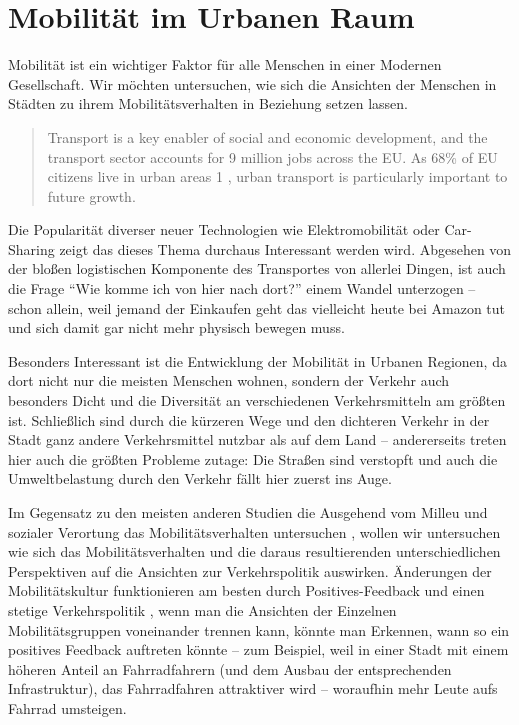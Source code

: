 \section{Mobilität im Urbanen Raum} %
	
	Mobilität ist ein wichtiger Faktor für alle Menschen in einer Modernen Gesellschaft.
	Wir möchten untersuchen, wie sich die Ansichten der Menschen in Städten zu ihrem Mobilitätsverhalten in Beziehung setzen lassen.

\begin{quote}
	Transport is a key enabler of social and economic development, and the transport sector
accounts for 9 million jobs across the EU. As 68\% of EU citizens live in urban areas 1 ,
urban transport is particularly important to future growth.
\emph{\parencite[2]{ebs406en}}
\end{quote}
	Die Popularität diverser neuer Technologien wie Elektromobilität oder Car-Sharing zeigt das dieses Thema durchaus Interessant werden wird.
	Abgesehen von der bloßen logistischen Komponente des Transportes von allerlei Dingen, ist auch die Frage \enquote{Wie komme ich von hier nach dort?} einem Wandel unterzogen – schon allein, weil jemand der Einkaufen geht das vielleicht heute bei Amazon tut und sich damit gar nicht mehr physisch bewegen muss.

	Besonders Interessant ist die Entwicklung der Mobilität in Urbanen Regionen, da dort nicht nur die meisten Menschen wohnen, sondern der Verkehr auch besonders Dicht und die Diversität an verschiedenen Verkehrsmitteln am größten ist.
	Schließlich sind durch die kürzeren Wege und den dichteren Verkehr in der Stadt ganz andere Verkehrsmittel nutzbar als auf dem Land – andererseits treten hier auch die größten Probleme zutage: Die Straßen sind verstopft und auch die Umweltbelastung durch den Verkehr fällt hier zuerst ins Auge.

	Im Gegensatz zu den meisten anderen Studien die Ausgehend vom Milleu und sozialer Verortung das Mobilitätsverhalten untersuchen \parencite{widmer}, wollen wir untersuchen wie sich das Mobilitätsverhalten und die daraus resultierenden unterschiedlichen Perspektiven auf die Ansichten zur Verkehrspolitik auswirken.
	Änderungen der Mobilitätskultur funktionieren am besten durch Positives-Feedback und einen stetige Verkehrspolitik \parencite{fh7}, wenn man die Ansichten der Einzelnen Mobilitätsgruppen voneinander trennen kann, könnte man Erkennen, wann so ein positives Feedback auftreten könnte – zum Beispiel, weil in einer Stadt mit einem höheren Anteil an Fahrradfahrern (und dem Ausbau der entsprechenden Infrastruktur), das Fahrradfahren attraktiver wird – woraufhin mehr Leute aufs Fahrrad umsteigen.

